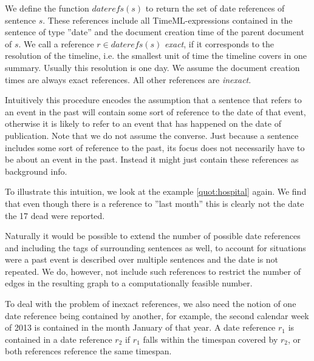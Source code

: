 \documentclass[a4paper,BCOR=10mm]{report}
\numberwithin{lemma}{chapter}
\numberwithin{definition}{chapter}
\begin{document}
We define the function $\mathit{daterefs}(s)$ to return the set of date references of sentence $s$. These references include all TimeML-expressions \citep{timeml} contained in the sentence of type ''date'' and the document creation time of the parent document of $s$.
We call a reference $r \in \mathit{daterefs}(s)$ \textit{exact}, if it corresponds to the resolution of the timeline, i.e. the smallest unit of time the timeline covers in one summary. Usually this resolution is one day. We assume the document creation times are always exact references. All other references are \textit{inexact}.

Intuitively this procedure encodes the assumption that a sentence that refers to an event in the past will contain some sort of reference to the date of that event, otherwise it is likely to refer to an event that has happened on the date of publication.
Note that we do not assume the converse. Just because a sentence includes some sort of reference to the past, its focus does not necessarily have to be about an event in the past. Instead it might just contain these references as background info.

To illustrate this intuition, we look at the example \ref{quot:hospital} again. We find that even though there is a reference to ''last month'' this is clearly not the date the 17 dead were reported.

Naturally it would be possible to extend the number of possible date references and including the tags of surrounding sentences as well, to account for situations were a past event is described over multiple sentences and the date is not repeated. We do, however, not include such references to restrict the number of edges in the resulting graph to a computationally feasible number.

To deal with the problem of inexact references, we also need the notion of one date reference being contained by another, for example, the second calendar week of 2013 is contained in the month January of that year.
A date reference $r_1$ is contained in a date reference $r_2$ if $r_1$ falls within the timespan covered by $r_2$, or both references reference the same timespan.
\end{document}
